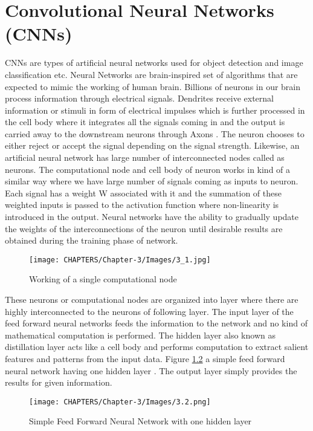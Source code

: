 \chapter{Convolutional Neural Networks (CNNs)}
\label{Chapter 3}

CNNs are types of artificial neural networks used 
for object detection and image classification etc. Neural Networks 
are brain-inspired set of algorithms that are expected to mimic the working 
of human brain. Billions of neurons in our brain process information through 
electrical signals. Dendrites receive external information or stimuli in form of 
electrical impulses which is further processed in the cell body where it integrates 
all the signals coming in and the output is carried away to the downstream neurons 
through Axons \cite{chap_3_article:1}. The neuron chooses to either reject or accept the signal depending on the signal strength. Likewise, an artificial neural network has large  number of interconnected nodes called as neurons. The computational node and cell body of neuron works in kind of a similar way where we have large number of signals coming as inputs to neuron. Each signal has a weight W associated with it and the 
summation of these weighted inputs is passed to the activation function where 
 non-linearity is introduced in the output. Neural networks have the ability to gradually 
update the weights of the interconnections of the neuron until desirable results 
are obtained during the training phase of network.

\begin{figure}[H]
	\centering
		\texttt{[image: CHAPTERS/Chapter-3/Images/3\_1.jpg]}
	\caption{Working of a single computational node}
	\label{fig:3.1}
\end{figure}

These neurons or computational nodes are organized 
into layer where there are highly interconnected to the neurons 
of following layer. The input layer of the feed forward neural 
networks feeds the information to the network and no kind of mathematical 
computation is performed. The hidden layer also known as distillation layer 
acts like a cell body and performs computation to extract salient features and 
patterns from the input data. Figure \ref{fig:3.2} a simple 
feed forward neural network having one 
hidden layer \cite{chap_3_article:2}.
The output layer simply provides the results for given information. 

\begin{figure}[H]
	\centering
		\texttt{[image: CHAPTERS/Chapter-3/Images/3.2.png]}
	\caption{Simple Feed Forward Neural Network with one hidden layer}
	\label{fig:3.2}
\end{figure}

